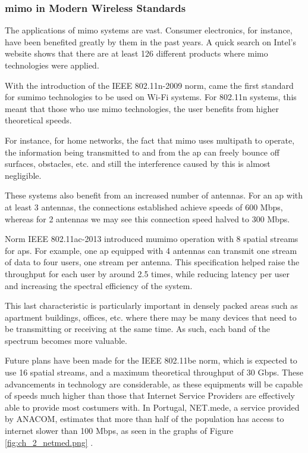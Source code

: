 \subsubsection{\ac{mimo} in Modern Wireless Standards}
\par The applications of \ac{mimo} systems are vast. Consumer electronics, for instance, have been benefited greatly by them in the past years. A quick search on Intel's website shows that there are at least 126 different products where \ac{mimo} technologies were applied.

\par With the introduction of the IEEE 802.11n-2009 norm, came the first standard for \ac{sumimo} technologies to be used on Wi-Fi systems. For 802.11n systems, this meant that those who use \ac{mimo} technologies, the user benefits from higher theoretical speeds.

\par For instance, for home networks, the fact that \ac{mimo} uses multipath to operate, the information being transmitted to and from the \ac{ap} can freely bounce off surfaces, obstacles, etc. and still the interference caused by this is almost negligible.

\par These systems also benefit from an increased number of antennas. For an \ac{ap}  with at least 3 antennas, the connections established achieve speeds of 600 Mbps, whereas for 2 antennas we may see this connection speed halved to 300 Mbps.

\par Norm IEEE 802.11ac-2013 introduced \ac{mumimo} operation with 8 spatial streams for \ac{ap}s. For example, one \ac{ap} equipped with 4 antennas can transmit one stream of data to four users, one stream per antenna. This specification helped raise the throughput for each user by around 2.5 times, while reducing latency per user and increasing the spectral efficiency of the system.

\par This last characteristic is particularly important in densely packed areas such as apartment buildings, offices, etc. where there may be many devices that need to be transmitting or receiving at the same time. As such, each band of the spectrum becomes more valuable.

\par Future plans have been made for the IEEE 802.11be norm, which is expected to use 16 spatial streams, and a maximum theoretical throughput of 30 Gbps. These advancements in technology are considerable, as these equipments will be capable of speeds much higher than those that Internet Service Providers are effectively able to provide most costumers with. In Portugal, NET.mede, a service provided by ANACOM, estimates that more than half of the population has access to internet slower than 100 Mbps, as seen in the graphs of Figure \ref{fig:ch_2_netmed.png} \cite{ANACOM2023EstastisticasNET.mede}.

